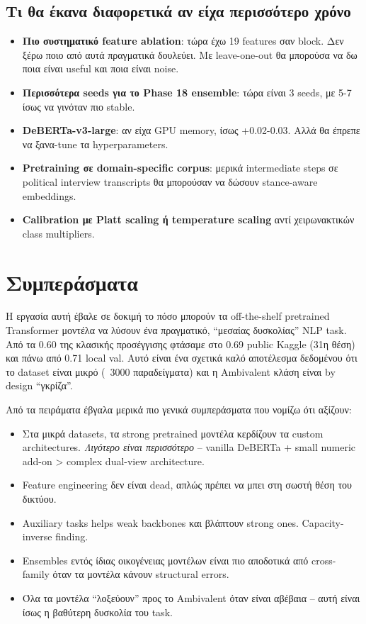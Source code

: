 \documentclass[12pt]{fphw}
\begin{document}
\subsection{Τι θα έκανα διαφορετικά αν είχα περισσότερο χρόνο}

\begin{itemize}
    \item \textbf{Πιο συστηματικό feature ablation}: τώρα έχω 19 features σαν block. Δεν ξέρω ποιο από αυτά πραγματικά δουλεύει. Με leave-one-out θα μπορούσα να δω ποια είναι useful και ποια είναι noise.
    \item \textbf{Περισσότερα seeds για το Phase 18 ensemble}: τώρα είναι 3 seeds, με 5-7 ίσως να γινόταν πιο stable.
    \item \textbf{DeBERTa-v3-large}: αν είχα GPU memory, ίσως +0.02-0.03. Αλλά θα έπρεπε να ξανα-tune τα hyperparameters.
    \item \textbf{Pretraining σε domain-specific corpus}: μερικά intermediate steps σε political interview transcripts θα μπορούσαν να δώσουν stance-aware embeddings.
    \item \textbf{Calibration με Platt scaling ή temperature scaling} αντί χειρωνακτικών class multipliers.
\end{itemize}

\section{Συμπεράσματα}

Η εργασία αυτή έβαλε σε δοκιμή το πόσο μπορούν τα off-the-shelf pretrained Transformer μοντέλα να λύσουν ένα πραγματικό, ``μεσαίας δυσκολίας'' NLP task. Από τα 0.60 της κλασικής προσέγγισης φτάσαμε στο 0.69 public Kaggle (31η θέση) και πάνω από 0.71 local val. Αυτό είναι ένα σχετικά καλό αποτέλεσμα δεδομένου ότι το dataset είναι μικρό (~3000 παραδείγματα) και η Ambivalent κλάση είναι by design ``γκρίζα''.

Από τα πειράματα έβγαλα μερικά πιο γενικά συμπεράσματα που νομίζω ότι αξίζουν:

\begin{itemize}
    \item Στα μικρά datasets, τα strong pretrained μοντέλα κερδίζουν τα custom architectures. \emph{Λιγότερο είναι περισσότερο} -- vanilla DeBERTa + small numeric add-on > complex dual-view architecture.
    \item Feature engineering δεν είναι dead, απλώς πρέπει να μπει στη σωστή θέση του δικτύου.
    \item Auxiliary tasks helps weak backbones και βλάπτουν strong ones. Capacity-inverse finding.
    \item Ensembles εντός ίδιας οικογένειας μοντέλων είναι πιο αποδοτικά από cross-family όταν τα μοντέλα κάνουν structural errors.
    \item Όλα τα μοντέλα ``λοξεύουν'' προς το Ambivalent όταν είναι αβέβαια -- αυτή είναι ίσως η βαθύτερη δυσκολία του task.
\end{itemize}
\end{document}
